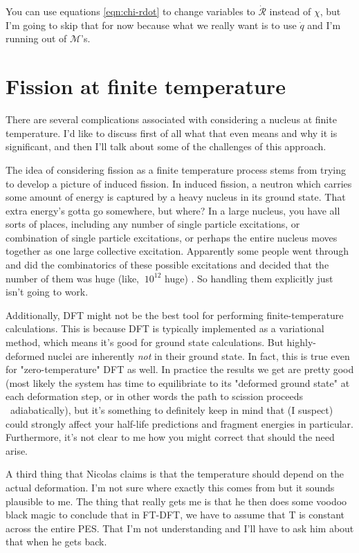 You can use equations \ref{eqn:chi-rdot} to change variables to $\mathcal{\dot{R}}$ instead of $\chi$, but I'm going to skip that for now because what we really want is to use $\dot{q}$ and I'm running out of $\mathcal{M}$'s.

\section{Fission at finite temperature}

There are several complications associated with considering a nucleus at finite temperature. I'd like to discuss first of all what that even means and why it is significant, and then I'll talk about some of the challenges of this approach.

The idea of considering fission as a finite temperature process stems from trying to develop a picture of induced fission. In induced fission, a neutron which carries some amount of energy is captured by a heavy nucleus in its ground state. That extra energy's gotta go somewhere, but where? In a large nucleus, you have all sorts of places, including any number of single particle excitations, or combination of single particle excitations, or perhaps the entire nucleus moves together as one large collective excitation. Apparently some people went through and did the combinatorics of these possible excitations and decided that the number of them was huge (like, $~10^{12}$ huge) \cite{Hilaire2012}. So handling them explicitly just isn't going to work.

Additionally, DFT might not be the best tool for performing finite-temperature calculations. This is because DFT is typically implemented as a variational method, which means it's good for ground state calculations. But highly-deformed nuclei are inherently \textit{not} in their ground state. In fact, this is true even for "zero-temperature" DFT as well. In practice the results we get are pretty good (most likely the system has time to equilibriate to its "deformed ground state" at each deformation step, or in other words the path to scission proceeds ~adiabatically), but it's something to definitely keep in mind that (I suspect) could strongly affect your half-life predictions and fragment energies in particular. Furthermore, it's not clear to me how you might correct that should the need arise.

A third thing that Nicolas claims is that the temperature should depend on the actual deformation. I'm not sure where exactly this comes from but it sounds plausible to me. The thing that really gets me is that he then does some voodoo black magic to conclude that in FT-DFT, we have to assume that T is constant across the entire PES. That I'm not understanding and I'll have to ask him about that when he gets back.